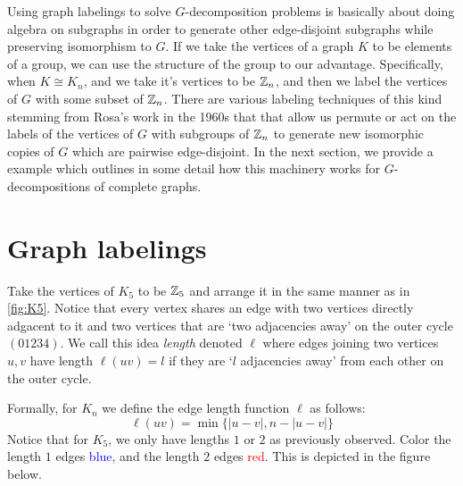 Using graph labelings to solve $G$-decomposition problems is basically about doing algebra on subgraphs in order to generate other edge-disjoint subgraphs while preserving isomorphism to $G$. If we take the vertices of a graph $K$ to be elements of a group, we can use the structure of the group to our advantage. Specifically, when $K\cong K_{n}$, and we take it's vertices to be $\mathbb{Z}_{n}$, and then we label the vertices of $G$ with some subset of $\mathbb{Z}_{n}$. There are various labeling techniques of this kind stemming from Rosa's work in the 1960s that that allow us permute or act on the labels of the vertices of $G$ with subgroups of $\mathbb{Z}_{n}$ to generate new isomorphic copies of $G$ which are pairwise edge-disjoint. In the next section, we provide a example which outlines in some detail how this machinery works for $G$-decompositions of complete graphs.
\section{Graph labelings}

Take the vertices of $K_{5}$ to be $\mathbb{Z}_{5}$ and arrange it in the same manner as in \ref{fig:K5}. Notice that every vertex shares an edge with two vertices directly adgacent to it and two vertices that are `two adjacencies away' on the outer cycle $(01234)$. We call this idea \textit{length} denoted $\ell$ where edges joining two vertices $u,v$ have length $\ell(uv)=l$ if they are `$l$ adjacencies away' from each other on the outer cycle. 

Formally, for $K_{n}$ we define the edge length function $\ell$ as follows:
$$\ell(uv)=\min\{|u-v|,n-|u-v|\}$$
Notice that for $K_{5}$, we only have lengths $1$ or $2$ as previously observed. Color the length $1$ edges \textcolor{blue}{blue}, and the length $2$ edges \textcolor{red}{red}. This is depicted in the figure below.

